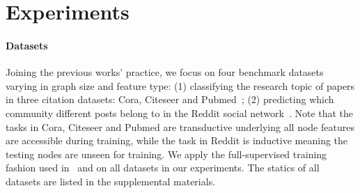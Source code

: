 \documentclass{article}
\begin{document}
\section{Experiments}
\label{sec:exps}

\paragraph{Datasets} Joining the previous works' practice, we focus on four benchmark datasets varying in graph size and feature type: (1) classifying the research topic of papers in three citation datasets: Cora, Citeseer and Pubmed~\citep{sen2008collective}; (2) predicting which community different posts belong to in the Reddit social network~\citep{hamilton2017inductive}. Note that the tasks in Cora, Citeseer and Pubmed are transductive underlying all node features are accessible during training, while the task in Reddit is inductive meaning the testing nodes are unseen for training. We apply the full-supervised training fashion used in~\citet{Huang2018} and \citet{chen2018fastgcn} on all datasets in our experiments. The statics of all datasets are listed in the supplemental materials.
\end{document}

